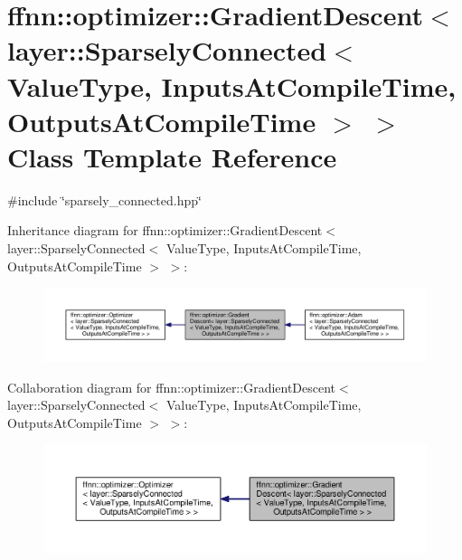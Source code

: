 \hypertarget{classffnn_1_1optimizer_1_1_gradient_descent_3_01layer_1_1_sparsely_connected_3_01_value_type_00_e6c27913ab0d90f52f73031aa88c19bf}{\section{ffnn\-:\-:optimizer\-:\-:Gradient\-Descent$<$ layer\-:\-:Sparsely\-Connected$<$ Value\-Type, Inputs\-At\-Compile\-Time, Outputs\-At\-Compile\-Time $>$ $>$ Class Template Reference}
\label{classffnn_1_1optimizer_1_1_gradient_descent_3_01layer_1_1_sparsely_connected_3_01_value_type_00_e6c27913ab0d90f52f73031aa88c19bf}
}


{\ttfamily \#include \char`\"{}sparsely\-\_\-connected.\-hpp\char`\"{}}



Inheritance diagram for ffnn\-:\-:optimizer\-:\-:Gradient\-Descent$<$ layer\-:\-:Sparsely\-Connected$<$ Value\-Type, Inputs\-At\-Compile\-Time, Outputs\-At\-Compile\-Time $>$ $>$\-:\nopagebreak
\begin{figure}[H]
\begin{center}
\leavevmode
\includegraphics[width=350pt]{classffnn_1_1optimizer_1_1_gradient_descent_3_01layer_1_1_sparsely_connected_3_01_value_type_00_cd778e175158c5a4356ddedca0ec7368}
\end{center}
\end{figure}


Collaboration diagram for ffnn\-:\-:optimizer\-:\-:Gradient\-Descent$<$ layer\-:\-:Sparsely\-Connected$<$ Value\-Type, Inputs\-At\-Compile\-Time, Outputs\-At\-Compile\-Time $>$ $>$\-:\nopagebreak
\begin{figure}[H]
\begin{center}
\leavevmode
\includegraphics[width=350pt]{classffnn_1_1optimizer_1_1_gradient_descent_3_01layer_1_1_sparsely_connected_3_01_value_type_00_6ef3327b68786a574793ed94879a29cc}
\end{center}
\end{figure}
